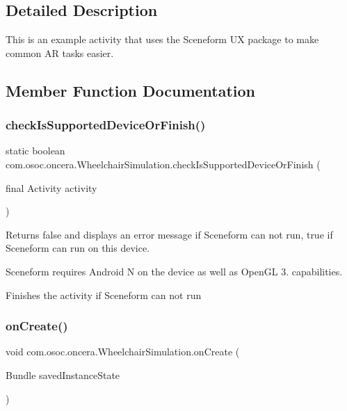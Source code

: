 \subsection{Detailed Description}
This is an example activity that uses the Sceneform UX package to make common AR tasks easier. 

\subsection{Member Function Documentation}
\mbox{\label{classcom_1_1osoc_1_1oncera_1_1_wheelchair_simulation_a36dde16db43f7196ea01fcf2a38c14b3}} 
\subsubsection{\texorpdfstring{checkIsSupportedDeviceOrFinish()}{checkIsSupportedDeviceOrFinish()}}
{\footnotesize\ttfamily static boolean com.\+osoc.\+oncera.\+Wheelchair\+Simulation.\+check\+Is\+Supported\+Device\+Or\+Finish (\begin{DoxyParamCaption}\item[{final Activity}]{activity }\end{DoxyParamCaption})\hspace{0.3cm}{\ttfamily [static]}}

Returns false and displays an error message if Sceneform can not run, true if Sceneform can run on this device.

Sceneform requires Android N on the device as well as Open\+GL 3. capabilities.

Finishes the activity if Sceneform can not run \mbox{\label{classcom_1_1osoc_1_1oncera_1_1_wheelchair_simulation_ac9324432150bd59c89d5b0979edf0d1e}} 
\subsubsection{\texorpdfstring{onCreate()}{onCreate()}}
{\footnotesize\ttfamily void com.\+osoc.\+oncera.\+Wheelchair\+Simulation.\+on\+Create (\begin{DoxyParamCaption}\item[{Bundle}]{saved\+Instance\+State }\end{DoxyParamCaption})\hspace{0.3cm}{\ttfamily [protected]}}

